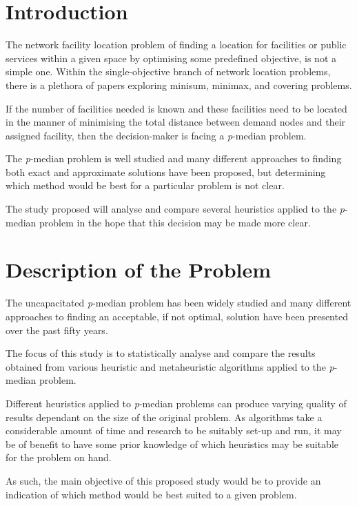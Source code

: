 \documentclass[11pt]{article}
\newcommand{\np}{\newpage}
\begin{document}
	\np
	
	
	\section{Introduction}
	The network facility location problem of finding a location for facilities or public services within a given space by optimising some predefined objective, is not a simple one.  Within the single-objective branch of network location problems, there is a plethora of papers exploring minisum, minimax, and covering problems.
	
	If the number of facilities needed is known and these facilities need to be located in the manner of minimising the total distance between demand nodes and their assigned facility, then the decision-maker is facing a \emph{p}-median problem.
	
	The \emph{p}-median problem  is well studied and many different approaches to finding both exact and approximate solutions have been proposed, but determining which method would be best for a particular problem is not clear.
	
	The study proposed will analyse and compare several heuristics applied to the \emph{p}-median problem in the hope that this decision may be made more clear.	
	
	
	\section{Description of the Problem}
	The uncapacitated \emph{p}-median problem has been widely studied and many different approaches to finding an acceptable, if not optimal, solution have been presented over the past fifty years.
	
	The focus of this study is to statistically analyse and compare the results obtained from various heuristic and metaheuristic algorithms applied to the \emph{p}-median problem.
	
	Different heuristics applied to \emph{p}-median problems can produce varying quality of results dependant on the size of the original problem.  As algorithms take a considerable amount of time and research to be suitably set-up and run, it may be of benefit to have some prior knowledge of which heuristics may be suitable for the problem on hand.
	
	As such, the main objective of this proposed study would be to provide an indication of which method would be best suited to a given problem.
	
\end{document}
